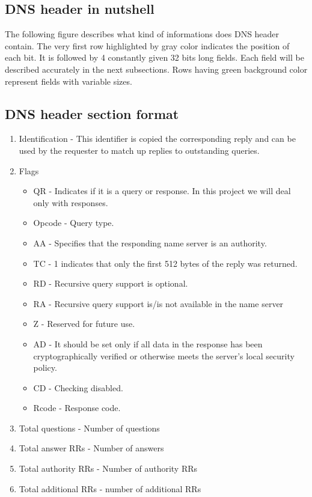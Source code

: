 \documentclass[11pt,a4paper]{article}
\begin{document}
\subsection{DNS header in nutshell}

The following figure describes what kind of informations does DNS header contain. The very first row highlighted by gray color indicates the position of each bit. It is followed by 4 constantly given 32 bits long fields. Each field will be described accurately in the next subsections. Rows having green background color represent fields with variable sizes. \\

\newpage

\subsection{DNS header section format}
\label{HEADER}

\begin{enumerate}
   \item Identification - This identifier is copied the corresponding reply and can be used by the requester to match up replies to outstanding queries.
   \item Flags
   \begin{itemize}
     \item QR - Indicates if it is a query or response. In this project we will deal only with responses.
     \item Opcode - Query type.
     \item AA - Specifies that the responding name server is an authority.
     \item TC - 1 indicates that only the first 512 bytes of the reply was returned.
     \item RD - Recursive query support is optional.
     \item RA - Recursive query support is/is not available in the name server
     \item Z - Reserved for future use.
     \item AD - It should be set only if all data in the response has been cryptographically verified or otherwise meets the server's local security policy.
     \item CD - Checking disabled.
     \item Rcode - Response code.
   \end{itemize}
   \item Total questions - Number of questions
   \item Total answer RRs - Number of answers
   \item Total authority RRs - Number of authority RRs
   \item Total additional RRs - number of additional RRs
\end{enumerate}
\end{document}
